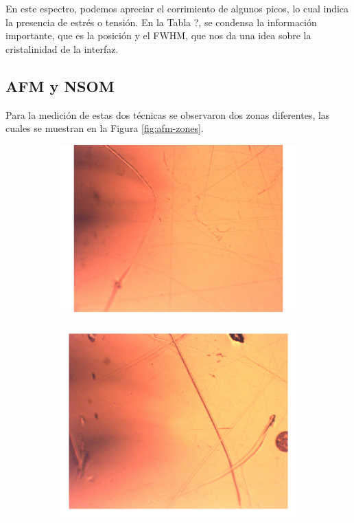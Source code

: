 En este espectro, podemos apreciar el corrimiento de algunos picos, lo cual indica la presencia de 
estrés o tensión. En la Tabla ?, se condensa la información importante, que es la posición y el 
FWHM, que nos da una idea sobre la cristalinidad de la interfaz.

\subsection{AFM y NSOM}
\label{sec:ch4-cdte-afm-nsom}
Para la medición de estas dos técnicas se observaron dos zonas diferentes, las cuales se muestran en la 
Figura \ref{fig:afm-zones}.

\begin{figure}[h!]
    \centering
    \begin{subfigure}[b]{0.45\textwidth}
        \centering
        \includegraphics[width = 1\textwidth]{figures/chap4/CdTe_Ag_Zona1_10X.pdf}
    \end{subfigure}\hfill
    \begin{subfigure}[b]{0.42\textwidth}
        \centering
        \includegraphics[width = 1\textwidth]{figures/chap4/CdTe_Ag_Zona2_10X.pdf}

\end{subfigure}
\end{figure}
